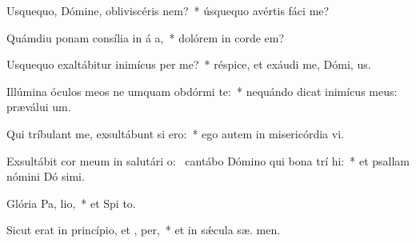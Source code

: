 \item Usquequo, Dómine, obliviscéris   nem?~* úsquequo avértis fáci   me?
\item Quámdiu ponam consília in á a,~* dolórem in corde   em?
\item Usquequo exaltábitur inimícus  per me?~* réspice, et exáudi me, Dómi,  us.
\item Illúmina óculos meos ne umquam obdórmi  te:~* nequándo dicat inimícus meus: præválui  um.
\item Qui tríbulant me, exsultábunt si  ero:~* ego autem in misericórdia  vi.
\item Exsultábit cor meum in salutári o:~\pscross{} cantábo Dómino qui bona trí hi:~* et psallam nómini Dó simi.
\item Glória Pa,  lio,~* et Spi to.
\item Sicut erat in princípio, et ,  per,~* et in sǽcula sæ. men.
